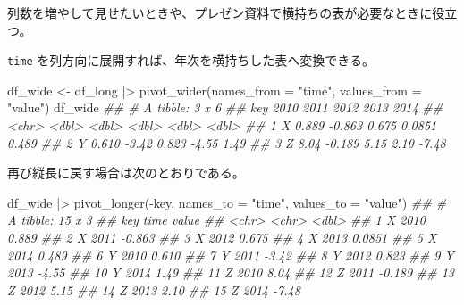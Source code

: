 \documentclass[
  letterpaper,
  xelatex,
  ja=standard, xelatex]{bxjsbook}
\newenvironment{Shaded}{\begin{snugshade}}{\end{snugshade}}
\newcommand{\AttributeTok}[1]{\textcolor[rgb]{0.40,0.45,0.13}{#1}}
\newcommand{\DocumentationTok}[1]{\textcolor[rgb]{0.37,0.37,0.37}{\textit{#1}}}
\newcommand{\FunctionTok}[1]{\textcolor[rgb]{0.28,0.35,0.67}{#1}}
\newcommand{\NormalTok}[1]{\textcolor[rgb]{0.00,0.23,0.31}{#1}}
\newcommand{\OtherTok}[1]{\textcolor[rgb]{0.00,0.23,0.31}{#1}}
\newcommand{\SpecialCharTok}[1]{\textcolor[rgb]{0.37,0.37,0.37}{#1}}
\newcommand{\StringTok}[1]{\textcolor[rgb]{0.13,0.47,0.30}{#1}}
\begin{document}
列数を増やして見せたいときや、プレゼン資料で横持ちの表が必要なときに役立つ。

\texttt{time} を列方向に展開すれば、年次を横持ちした表へ変換できる。

\begin{Shaded}
\begin{Highlighting}[]
\NormalTok{df\_wide }\OtherTok{\textless{}{-}}\NormalTok{ df\_long }\SpecialCharTok{|\textgreater{}} 
  \FunctionTok{pivot\_wider}\NormalTok{(}\AttributeTok{names\_from =} \StringTok{"time"}\NormalTok{, }\AttributeTok{values\_from =} \StringTok{"value"}\NormalTok{)}
\NormalTok{df\_wide}
\DocumentationTok{\#\# \# A tibble: 3 x 6}
\DocumentationTok{\#\#   key   \textasciigrave{}2010\textasciigrave{} \textasciigrave{}2011\textasciigrave{} \textasciigrave{}2012\textasciigrave{}  \textasciigrave{}2013\textasciigrave{} \textasciigrave{}2014\textasciigrave{}}
\DocumentationTok{\#\#   \textless{}chr\textgreater{}  \textless{}dbl\textgreater{}  \textless{}dbl\textgreater{}  \textless{}dbl\textgreater{}   \textless{}dbl\textgreater{}  \textless{}dbl\textgreater{}}
\DocumentationTok{\#\# 1 X      0.889 {-}0.863  0.675  0.0851  0.489}
\DocumentationTok{\#\# 2 Y      0.610 {-}3.42   0.823 {-}4.55    1.49 }
\DocumentationTok{\#\# 3 Z      8.04  {-}0.189  5.15   2.10   {-}7.48}
\end{Highlighting}
\end{Shaded}

再び縦長に戻す場合は次のとおりである。

\begin{Shaded}
\begin{Highlighting}[]
\NormalTok{df\_wide }\SpecialCharTok{|\textgreater{}} 
  \FunctionTok{pivot\_longer}\NormalTok{(}\SpecialCharTok{{-}}\NormalTok{key, }\AttributeTok{names\_to =} \StringTok{"time"}\NormalTok{, }\AttributeTok{values\_to =} \StringTok{"value"}\NormalTok{)}
\DocumentationTok{\#\# \# A tibble: 15 x 3}
\DocumentationTok{\#\#    key   time    value}
\DocumentationTok{\#\#    \textless{}chr\textgreater{} \textless{}chr\textgreater{}   \textless{}dbl\textgreater{}}
\DocumentationTok{\#\#  1 X     2010   0.889 }
\DocumentationTok{\#\#  2 X     2011  {-}0.863 }
\DocumentationTok{\#\#  3 X     2012   0.675 }
\DocumentationTok{\#\#  4 X     2013   0.0851}
\DocumentationTok{\#\#  5 X     2014   0.489 }
\DocumentationTok{\#\#  6 Y     2010   0.610 }
\DocumentationTok{\#\#  7 Y     2011  {-}3.42  }
\DocumentationTok{\#\#  8 Y     2012   0.823 }
\DocumentationTok{\#\#  9 Y     2013  {-}4.55  }
\DocumentationTok{\#\# 10 Y     2014   1.49  }
\DocumentationTok{\#\# 11 Z     2010   8.04  }
\DocumentationTok{\#\# 12 Z     2011  {-}0.189 }
\DocumentationTok{\#\# 13 Z     2012   5.15  }
\DocumentationTok{\#\# 14 Z     2013   2.10  }
\DocumentationTok{\#\# 15 Z     2014  {-}7.48}
\end{Highlighting}
\end{Shaded}
\end{document}
